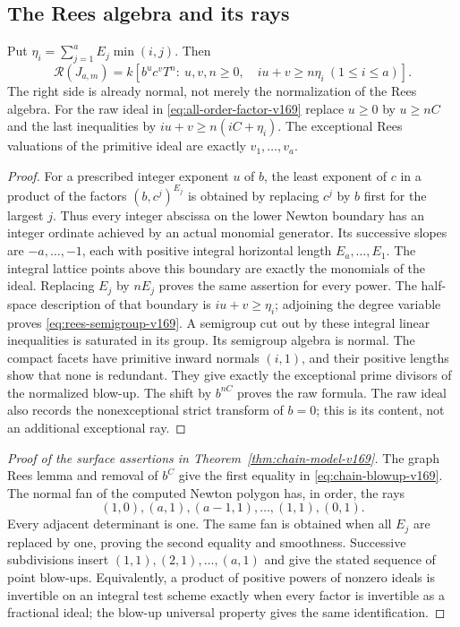 \subsection{The Rees algebra and its rays}
\begin{proposition}\label{prop:rees-v169}
Put $\eta_i=\sum_{j=1}^aE_j\min(i,j)$. Then
\begin{equation}\label{eq:rees-semigroup-v169}
 \mathcal R(J_{a,m})=
 k[b^u c^v T^n:\ u,v,n\geq0,\quad
                 iu+v\geq n\eta_i\ (1\leq i\leq a)].
\end{equation}
The right side is already normal, not merely the normalization of the
Rees algebra. For the raw ideal in \eqref{eq:all-order-factor-v169}
replace $u\geq0$ by $u\geq nC$ and the last inequalities by
$iu+v\geq n(iC+\eta_i)$. The exceptional Rees valuations of the
primitive ideal are exactly $v_1,\ldots,v_a$.
\end{proposition}
\begin{proof}
For a prescribed integer exponent $u$ of $b$, the least exponent of
$c$ in a product of the factors $(b,c^j)^{E_j}$ is obtained by replacing
$c^j$ by $b$ first for the largest $j$. Thus every integer abscissa
on the lower Newton boundary has an integer ordinate achieved by an
actual monomial generator. Its successive slopes are $-a,\ldots,-1$,
each with positive integral horizontal length $E_a,\ldots,E_1$.
The integral lattice points above this boundary are exactly the
monomials of the ideal. Replacing $E_j$ by $nE_j$ proves the same
assertion for every power. The half-space description of that boundary
is $iu+v\geq\eta_i$; adjoining the degree variable proves
\eqref{eq:rees-semigroup-v169}. A semigroup cut out by these integral
linear inequalities is saturated in its group. Its semigroup algebra
is normal. The compact facets have primitive inward normals $(i,1)$,
and their positive lengths show that none is redundant. They give
exactly the exceptional prime divisors of the normalized blow-up.
The shift by $b^{nC}$ proves the raw formula. The raw ideal also records
the nonexceptional strict transform of $b=0$; this is its content, not
an additional exceptional ray.
\end{proof}

\begin{proof}[Proof of the surface assertions in Theorem~\ref{thm:chain-model-v169}]
The graph Rees lemma and removal of $b^C$ give the first equality in
\eqref{eq:chain-blowup-v169}. The normal fan of the computed Newton
polygon has, in order, the rays
\[
 (1,0),(a,1),(a-1,1),\ldots,(1,1),(0,1).
\]
Every adjacent determinant is one. The same fan is obtained when all
$E_j$ are replaced by one, proving the second equality and smoothness.
Successive subdivisions insert $(1,1),(2,1),\ldots,(a,1)$ and give
the stated sequence of point blow-ups. Equivalently, a product of
positive powers of nonzero ideals is invertible on an integral test
scheme exactly when every factor is invertible as a fractional ideal;
the blow-up universal property gives the same identification.
\end{proof}


